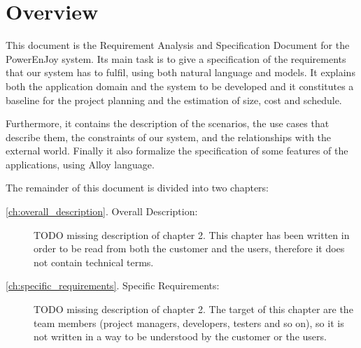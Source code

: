\section{Overview}
This document is the Requirement Analysis and Specification Document for the PowerEnJoy system.
Its main task is to give a specification of the requirements that our system has to fulfil, using both natural language and models.
It explains both the application domain and the system to be developed and it constitutes a baseline for the project planning and the estimation of size, cost and schedule.

Furthermore, it contains the description of the scenarios, the use cases that describe them, the constraints of our system, and the relationships with the external world. Finally it also formalize the specification of some features of the applications, using Alloy language.

The remainder of this document is divided into two chapters:
\begin{description}
	\item [\autoref{ch:overall_description}. Overall Description:] TODO missing description of chapter 2. %
	This chapter has been written in order to be read from both the customer and the users, therefore it does not contain technical terms.
	\item [\autoref{ch:specific_requirements}. Specific Requirements:] TODO missing description of chapter 2. %
	The target of this chapter are the team members (project managers, developers, testers and so on), so it is not written in a way to be understood by the customer or the users.
\end{description}
